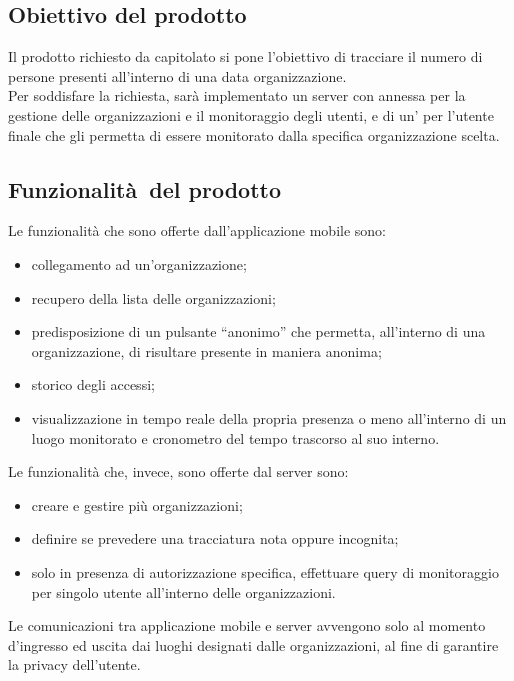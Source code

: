 \documentclass[../analisi-dei-requisiti]{subfiles}
\begin{document}
\subsection{Obiettivo del prodotto}%
\label{sub:obiettivo_del_prodotto}
Il prodotto richiesto da capitolato si pone l'obiettivo di tracciare il numero di persone presenti all’interno di una data organizzazione.\\
Per soddisfare la richiesta, sarà implementato un server con annessa  per la gestione delle organizzazioni e il monitoraggio degli utenti, e
di un' per l'utente finale che gli permetta di essere monitorato dalla specifica organizzazione scelta.

\subsection{Funzionalità del prodotto}%
\label{sub:funzionalita_del_prodotto}
Le funzionalità che sono offerte dall'applicazione mobile sono:
\begin{itemize}
  \item collegamento ad un’organizzazione;
  \item recupero della lista delle organizzazioni;
  \item predisposizione di un pulsante “anonimo” che permetta, all’interno di una organizzazione, di risultare presente in maniera anonima;
  \item storico degli accessi;
  \item visualizzazione in tempo reale della propria presenza o meno all’interno di un luogo monitorato e cronometro del tempo trascorso al suo interno.
\end{itemize}

Le funzionalità che, invece, sono offerte dal server sono:
\begin{itemize}
  \item creare e gestire più organizzazioni;
  \item definire se prevedere una tracciatura nota oppure incognita;
  \item solo in presenza di autorizzazione specifica, effettuare query di monitoraggio per singolo utente all’interno delle organizzazioni.
\end{itemize}
Le comunicazioni tra applicazione mobile e server avvengono solo al momento d'ingresso ed uscita dai luoghi designati dalle organizzazioni, al fine di garantire
la privacy dell'utente.
\end{document}
